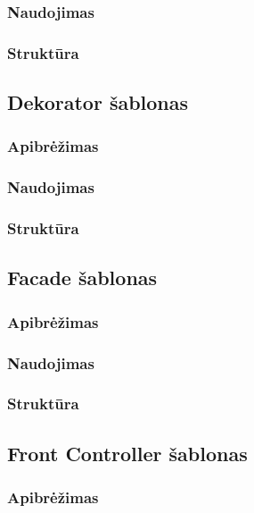\documentclass[10pt]{IEEEtran}
\begin{document}
			\subsubsection{Naudojimas}

			\subsubsection{Struktūra}

		\subsection{Dekorator šablonas}

			\subsubsection{Apibrėžimas}

			\subsubsection{Naudojimas}

			\subsubsection{Struktūra}

		\subsection{Facade šablonas}

			\subsubsection{Apibrėžimas}

			\subsubsection{Naudojimas}

			\subsubsection{Struktūra}

		\subsection{Front Controller šablonas}

			\subsubsection{Apibrėžimas}
\end{document}
